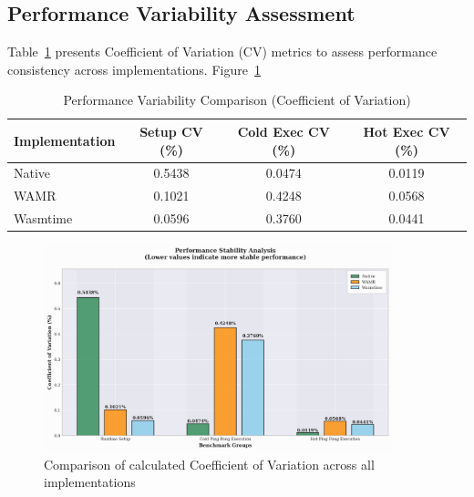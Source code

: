 \subsection{Performance Variability Assessment}
\label{subsec:eval-execution-variability}

Table~\ref{tab:variability} presents Coefficient of Variation (CV) metrics to assess performance consistency across implementations. Figure~\ref{fig:variability-comparison}

\begin{table}[h]
    \centering
    \caption{Performance Variability Comparison (Coefficient of Variation)}
    \label{tab:variability}
    \begin{tabular}{lccc}
    \toprule
    \textbf{Implementation} & \textbf{Setup CV (\%)} & \textbf{Cold Exec CV (\%)} & \textbf{Hot Exec CV (\%)} \\
    \midrule
    Native       & 0.5438 & 0.0474 & 0.0119 \\
    WAMR         & 0.1021 & 0.4248 & 0.0568 \\
    Wasmtime     & 0.0596 & 0.3760 & 0.0441 \\
    \bottomrule
    \end{tabular}
\end{table}

\begin{figure}[h]
    \centering
    \includegraphics[width=0.9\textwidth]{images/variability-comparison}
    \caption{Comparison of calculated Coefficient of Variation across all implementations}
    \label{fig:variability-comparison}
\end{figure}

